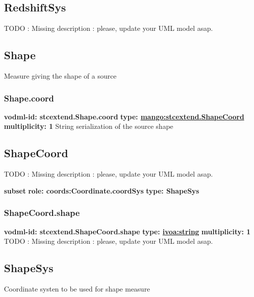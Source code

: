   \subsection{RedshiftSys}
  \label{sect:stcextend.RedshiftSys}
    TODO : Missing description : please, update your UML model asap.

  \subsection{Shape}
  \label{sect:stcextend.Shape}
    Measure giving the shape of a source

    \subsubsection{Shape.coord}
      \textbf{vodml-id: stcextend.Shape.coord} \newline
      \textbf{type: \hyperref[sect:stcextend.ShapeCoord]{mango:stcextend.ShapeCoord}} \newline
      \textbf{multiplicity: 1} \newline 
      String serialization of the source shape

  \subsection{ShapeCoord}
  \label{sect:stcextend.ShapeCoord}
    TODO : Missing description : please, update your UML model asap.

    \noindent \textbf{subset} \newline
    \indent   \textbf{role: coords:Coordinate.coordSys} \newline
    \indent   \textbf{type: ShapeSys} \newline


    \subsubsection{ShapeCoord.shape}
      \textbf{vodml-id: stcextend.ShapeCoord.shape} \newline
      \textbf{type: \hyperref[sect:ivoa]{ivoa:string}} \newline
      \textbf{multiplicity: 1} \newline 
      TODO : Missing description : please, update your UML model asap.

  \subsection{ShapeSys}
  \label{sect:stcextend.ShapeSys}
    Coordinate systen to be used for shape measure

